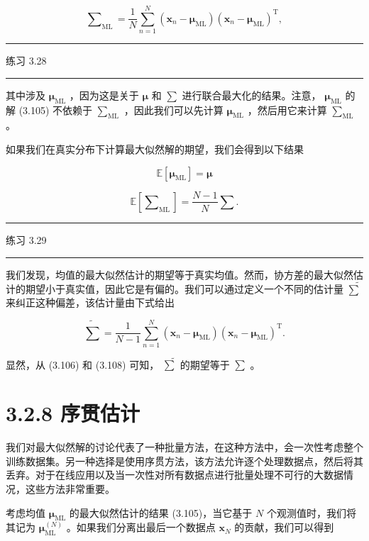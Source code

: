 \documentclass[10pt]{article}
\newcommand{\HRule}{\begin{center}\rule{0.9\linewidth}{0.2mm}\end{center}}
\begin{document}
\[
{\mathbf{\sum }}_{\mathrm{{ML}}} = \frac{1}{N}\mathop{\sum }\limits_{{n = 1}}^{N}\left( {{\mathbf{x}}_{n} - {\mathbf{\mu }}_{\mathrm{{ML}}}}\right) {\left( {\mathbf{x}}_{n} - {\mathbf{\mu }}_{\mathrm{{ML}}}\right) }^{\mathrm{T}}, \tag{3.106}
\]

\HRule

练习 3.28

\HRule

其中涉及 \({\mathbf{\mu }}_{\mathrm{{ML}}}\) ，因为这是关于 \(\mathbf{\mu }\) 和 \(\mathbf{\sum }\) 进行联合最大化的结果。注意， \({\mathbf{\mu }}_{\mathrm{{ML}}}\) 的解 (3.105) 不依赖于 \({\mathbf{\sum }}_{\mathrm{{ML}}}\) ，因此我们可以先计算 \({\mathbf{\mu }}_{\mathrm{{ML}}}\) ，然后用它来计算 \({\mathbf{\sum }}_{\mathrm{{ML}}}\) 。

如果我们在真实分布下计算最大似然解的期望，我们会得到以下结果

\[
\mathbb{E}\left\lbrack  {\mathbf{\mu }}_{\mathrm{{ML}}}\right\rbrack   = \mathbf{\mu } \tag{3.107}
\]

\[
\mathbb{E}\left\lbrack  {\mathbf{\sum }}_{\mathrm{{ML}}}\right\rbrack   = \frac{N - 1}{N}\mathbf{\sum }. \tag{3.108}
\]

\HRule

练习 3.29

\HRule

我们发现，均值的最大似然估计的期望等于真实均值。然而，协方差的最大似然估计的期望小于真实值，因此它是有偏的。我们可以通过定义一个不同的估计量 \(\widetilde{\mathbf{\sum }}\) 来纠正这种偏差，该估计量由下式给出

\[
\widetilde{\mathbf{\sum }} = \frac{1}{N - 1}\mathop{\sum }\limits_{{n = 1}}^{N}\left( {{\mathbf{x}}_{n} - {\mathbf{\mu }}_{\mathrm{{ML}}}}\right) {\left( {\mathbf{x}}_{n} - {\mathbf{\mu }}_{\mathrm{{ML}}}\right) }^{\mathrm{T}}. \tag{3.109}
\]

显然，从 (3.106) 和 (3.108) 可知， \(\widetilde{\mathbf{\sum }}\) 的期望等于 \(\mathbf{\sum }\) 。

\section*{3.2.8 序贯估计}

我们对最大似然解的讨论代表了一种批量方法，在这种方法中，会一次性考虑整个训练数据集。另一种选择是使用序贯方法，该方法允许逐个处理数据点，然后将其丢弃。对于在线应用以及当一次性对所有数据点进行批量处理不可行的大数据情况，这些方法非常重要。

考虑均值 \({\mathbf{\mu }}_{\mathrm{{ML}}}\) 的最大似然估计的结果 (3.105)，当它基于 \(N\) 个观测值时，我们将其记为 \({\mathbf{\mu }}_{\mathrm{{ML}}}^{\left( N\right) }\) 。如果我们分离出最后一个数据点 \({\mathbf{x}}_{N}\) 的贡献，我们可以得到
\end{document}
